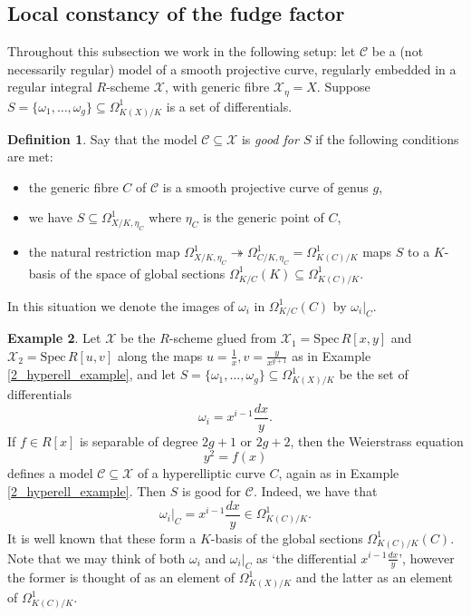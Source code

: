 \documentclass{article}
\theoremstyle{definition}
\newtheorem{defn}{Definition}[section]
\newtheorem{example}[defn]{Example}
\theoremstyle{plain}
\theoremstyle{remark}
\newcommand{\spec}{\mathrm{Spec}\,}
\newcommand{\onto}{\twoheadrightarrow}
\begin{document}
	\subsection{Local constancy of the fudge factor}
	Throughout this subsection we work in the following setup: let $\mathcal{C}$ be a (not necessarily regular) model of a smooth projective curve, regularly embedded in a regular integral $R$-scheme $\mathcal{X}$, with generic fibre $\mathcal{X}_\eta = X$. Suppose $S = \{\omega_1, \ldots, \omega_g\}\subseteq \Omega^1_{K(X)/K}$ is a set of differentials.
	\begin{defn}\label{defn_good_for_S}
		Say that the model $\mathcal{C}\subseteq \mathcal{X}$ is \emph{good for $S$} if the following conditions are met:
		\begin{itemize}
			\item the generic fibre $C$ of $\mathcal{C}$ is a smooth projective curve of genus $g$,
			\item we have $S\subseteq \Omega^1_{X/K, \eta_C}$ where $\eta_C$ is the generic point of $C$,
			\item the natural restriction map $\Omega^1_{X/K, \eta_C}\onto \Omega^1_{C/K, \eta_C} =\Omega^1_{K(C)/K}$ maps $S$ to a $K$-basis of the space of global sections $\Omega^1_{K/C}(K) \subseteq \Omega^1_{K(C)/K}$.
		\end{itemize}
		In this situation we denote the images of $\omega_i$ in $\Omega^1_{K/C}(C)$ by $\omega_i|_C$.
	\end{defn}
	\begin{example}
		Let $\mathcal{X}$ be the $R$-scheme glued from $\mathcal{X}_1 = \spec R[x,y]$ and $\mathcal{X}_2 = \spec R[u,v]$ along the maps $u = \frac{1}{x}, v = \frac{y}{x^{g+1}}$ as in Example \ref{2_hyperell_example}, and let $S = \{\omega_1, \ldots, \omega_g\}\subseteq \Omega^1_{K(X)/K}$ be the set of differentials
		\[\omega_i = x^{i-1}\frac{dx}{y}.\]
		If $f\in R[x]$ is separable of degree $2g+1$ or $2g+2$, then the Weierstrass equation
		\[y^2 = f(x)\]
		defines a model $\mathcal{C}\subseteq \mathcal{X}$ of a hyperelliptic curve $C$, again as in Example \ref{2_hyperell_example}. Then $S$ is good for $\mathcal{C}$. Indeed, we have that
		\[\omega_i|_C = x^{i-1}\frac{dx}{y}\in \Omega^1_{K(C)/K}.\]
		It is well known that these form a $K$-basis of the global sections $\Omega^1_{K(C)/K}(C)$. Note that we may think of both $\omega_i$ and $\omega_i|_C$ as `the differential $x^{i-1}\frac{dx}{y}$', however the former is thought of as an element of $\Omega^1_{K(X)/K}$ and the latter as an element of $\Omega^1_{K(C)/K}$.
	\end{example}
\end{document}
